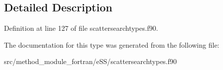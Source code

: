 \subsection{Detailed Description}


Definition at line 127 of file scattersearchtypes.\-f90.



The documentation for this type was generated from the following file\-:\begin{DoxyCompactItemize}
\item 
src/method\-\_\-module\-\_\-fortran/e\-S\-S/scattersearchtypes.\-f90\end{DoxyCompactItemize}
